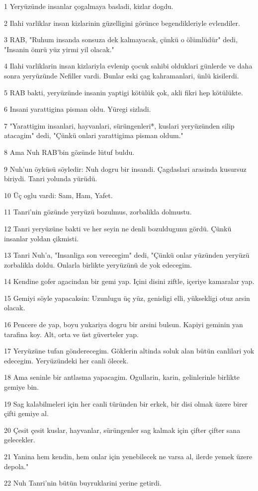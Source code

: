 \par 1 Yeryüzünde insanlar çogalmaya basladi, kizlar dogdu.
\par 2 Ilahi varliklar insan kizlarinin güzelligini görünce begendikleriyle evlendiler.
\par 3 RAB, "Ruhum insanda sonsuza dek kalmayacak, çünkü o ölümlüdür" dedi, "Insanin ömrü yüz yirmi yil olacak."
\par 4 Ilahi varliklarin insan kizlariyla evlenip çocuk sahibi olduklari günlerde ve daha sonra yeryüzünde Nefiller vardi. Bunlar eski çag kahramanlari, ünlü kisilerdi.
\par 5 RAB bakti, yeryüzünde insanin yaptigi kötülük çok, akli fikri hep kötülükte.
\par 6 Insani yarattigina pisman oldu. Yüregi sizladi.
\par 7 "Yarattigim insanlari, hayvanlari, sürüngenleri*, kuslari yeryüzünden silip atacagim" dedi, "Çünkü onlari yarattigima pisman oldum."
\par 8 Ama Nuh RAB'bin gözünde lütuf buldu.
\par 9 Nuh'un öyküsü söyledir: Nuh dogru bir insandi. Çagdaslari arasinda kusursuz biriydi. Tanri yolunda yürüdü.
\par 10 Üç oglu vardi: Sam, Ham, Yafet.
\par 11 Tanri'nin gözünde yeryüzü bozulmus, zorbalikla dolmustu.
\par 12 Tanri yeryüzüne bakti ve her seyin ne denli bozuldugunu gördü. Çünkü insanlar yoldan çikmisti.
\par 13 Tanri Nuh'a, "Insanliga son verecegim" dedi, "Çünkü onlar yüzünden yeryüzü zorbalikla doldu. Onlarla birlikte yeryüzünü de yok edecegim.
\par 14 Kendine gofer agacindan bir gemi yap. Içini disini ziftle, içeriye kamaralar yap.
\par 15 Gemiyi söyle yapacaksin: Uzunlugu üç yüz, genisligi elli, yüksekligi otuz arsin olacak.
\par 16 Pencere de yap, boyu yukariya dogru bir arsini bulsun. Kapiyi geminin yan tarafina koy. Alt, orta ve üst güverteler yap.
\par 17 Yeryüzüne tufan gönderecegim. Göklerin altinda soluk alan bütün canlilari yok edecegim. Yeryüzündeki her canli ölecek.
\par 18 Ama seninle bir antlasma yapacagim. Ogullarin, karin, gelinlerinle birlikte gemiye bin.
\par 19 Sag kalabilmeleri için her canli türünden bir erkek, bir disi olmak üzere birer çifti gemiye al.
\par 20 Çesit çesit kuslar, hayvanlar, sürüngenler sag kalmak için çifter çifter sana gelecekler.
\par 21 Yanina hem kendin, hem onlar için yenebilecek ne varsa al, ilerde yemek üzere depola."
\par 22 Nuh Tanri'nin bütün buyruklarini yerine getirdi.

